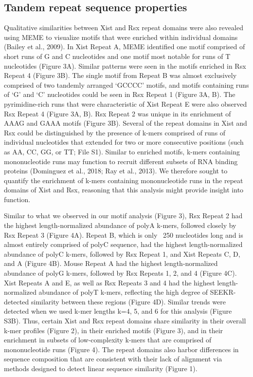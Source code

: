 \subsection{Tandem repeat sequence properties}
Qualitative similarities between Xist and Rsx repeat domains were also revealed using MEME to visualize motifs that were enriched within individual domains (Bailey et al., 2009). In Xist Repeat A, MEME identified one motif comprised of short runs of G and C nucleotides and one motif most notable for runs of T nucleotides (Figure 3A). Similar patterns were seen in the motifs enriched in Rsx Repeat 4 (Figure 3B). The single motif from Repeat B was almost exclusively comprised of two tandemly arranged ‘GCCCC’ motifs, and motifs containing runs of ‘G’ and ‘C’ nucleotides could be seen in Rsx Repeat 1 (Figure 3A, B). The pyrimidine-rich runs that were characteristic of Xist Repeat E were also observed Rsx Repeat 4 (Figure 3A, B). Rsx Repeat 2 was unique in its enrichment of AAAG and GAAA motifs (Figure 3B).
Several of the repeat domains in Xist and Rsx could be distinguished by the presence of k-mers comprised of runs of individual nucleotides that extended for two or more consecutive positions (such as AA, CC, GG, or TT; File S1). Similar to enriched motifs, k-mers containing mononucleotide runs may function to recruit different subsets of RNA binding proteins (Dominguez et al., 2018; Ray et al., 2013). We therefore sought to quantify the enrichment of k-mers containing mononucleotide runs in the repeat domains of Xist and Rsx, reasoning that this analysis might provide insight into function. 

Similar to what we observed in our motif analysis (Figure 3), Rsx Repeat 2 had the highest length-normalized abundance of polyA k-mers, followed closely by Rsx Repeat 3 (Figure 4A). Repeat B, which is only ~250 nucleotides long and is almost entirely comprised of polyC sequence, had the highest length-normalized abundance of polyC k-mers, followed by Rsx Repeat 1, and Xist Repeats C, D, and A (Figure 4B). Mouse Repeat A had the highest length-normalized abundance of polyG k-mers, followed by Rsx Repeats 1, 2, and 4 (Figure 4C). Xist Repeats A and E, as well as Rsx Repeats 3 and 4 had the highest length-normalized abundance of polyT k-mers, reflecting the high degree of SEEKR-detected similarity between these regions (Figure 4D). Similar trends were detected when we used k-mer lengths k=4, 5, and 6 for this analysis (Figure S3B). Thus, certain Xist and Rsx repeat domains share similarity in their overall k-mer profiles (Figure 2), in their enriched motifs (Figure 3), and in their enrichment in subsets of low-complexity k-mers that are comprised of mononucleotide runs (Figure 4). The repeat domains also harbor differences in sequence composition that are consistent with their lack of alignment via methods designed to detect linear sequence similarity (Figure 1).


